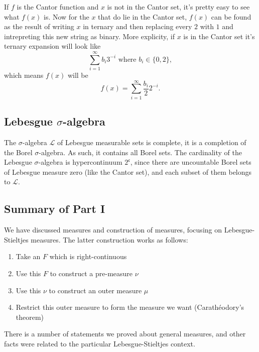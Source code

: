 \documentclass{article}
\theoremstyle{definition}
\begin{document}
If \( f \) is the Cantor function and \( x \) is not in the Cantor set, it's
pretty easy to see what \( f(x) \) is. Now for the \( x \) that do lie in
the Cantor set, \( f(x) \) can be found as the result of writing
\( x \) in ternary and then replacing every \( 2 \) with \( 1 \) and
intrepreting this new string as binary.
More explicity, if \( x \) is in the Cantor set it's ternary expansion will
look like
\begin{displaymath}
    \sum_{i = 1}^{\infty} b_{i} 3^{- i} \text{ where } b_{i} \in \{ 0,2 \},
\end{displaymath}
which means \( f(x) \) will be
\begin{displaymath}
    f(x) = \sum_{i = 1}^{\infty} \frac{b_{i}}{2} 2^{- i}.
\end{displaymath}

\subsection{Lebesgue $\sigma$-algebra}

The $\sigma$-algebra $\mathscr{L}$
of Lebesgue measurable
sets is complete, it is a completion of the Borel $\sigma$-algebra.
As such, it contains all Borel sets.
The cardinality of the Lebesgue $\sigma$-algebra is hypercontinuum
$2^{\mathfrak{c}}$, since there are uncountable 
Borel sets of Lebesgue measure zero (like the Cantor set), and 
each subset of them belongs to $\mathscr{L}$.

\subsection{Summary of Part I}

We have discussed measures and construction of measures,
focusing on Lebesgue-Stieltjes measures.
The latter construction works as follows:
\begin{enumerate}[1)]
		\item Take an \(F\) which is right-continuous
		\item Use this \(F\) to construct a pre-measure \(\nu\)
		\item Use this \(\nu\) to construct an outer measure \(\mu\)
		\item Restrict this outer measure to form the measure we want
				(Carath\'eodory's theorem)
\end{enumerate}

There is a number of statements we proved 
about general measures, and 
other facts were related to the particular Lebesgue-Stieltjes
context. 
\end{document}
